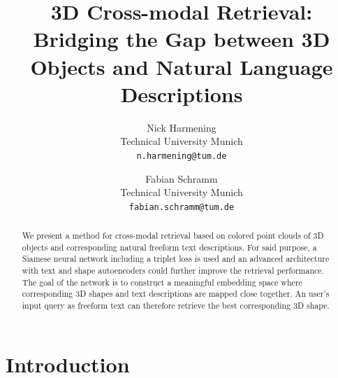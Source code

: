 \documentclass[10pt,twocolumn,letterpaper]{article}
\begin{document}
\title{3D Cross-modal Retrieval: Bridging the Gap between 3D Objects and Natural Language Descriptions}

\author{Nick Harmening\\
Technical University Munich\\
{\tt\small n.harmening@tum.de}
\and
Fabian Schramm\\
Technical University Munich\\
{\tt\small fabian.schramm@tum.de}
}

\maketitle

\begin{abstract}
   We present a method for cross-modal retrieval based on colored point clouds of 3D objects and corresponding natural freeform text descriptions. For said purpose, a Siamese neural network including a triplet loss is used and an advanced architecture with text and shape autoencoders could further improve the retrieval performance. The goal of the network is to construct a meaningful embedding space where corresponding 3D shapes and text descriptions are mapped close together. An user's input query as freeform text can therefore retrieve the best corresponding 3D shape.
\end{abstract}

\section{Introduction}
\end{document}

